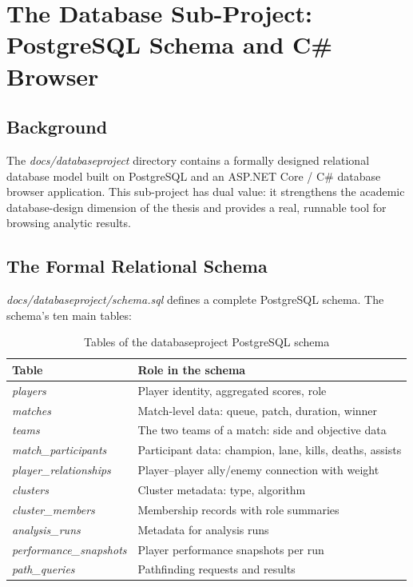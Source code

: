 \chapter{The Database Sub-Project: PostgreSQL Schema and C\# Browser}

\section{Background}

The \textit{docs/databaseproject} directory contains a formally designed relational database model built on PostgreSQL and an ASP.NET Core / C\# database browser application. This sub-project has dual value: it strengthens the academic database-design dimension of the thesis and provides a real, runnable tool for browsing analytic results.

\section{The Formal Relational Schema}

\textit{docs/databaseproject/schema.sql} defines a complete PostgreSQL schema. The schema's ten main tables:

\begin{table}[H]
\centering
\caption{Tables of the databaseproject PostgreSQL schema}
\begin{tabularx}{\textwidth}{|>{\raggedright\arraybackslash}p{4.5cm}|X|}
\hline
\textbf{Table} & \textbf{Role in the schema} \\
\hline
\textit{players} & Player identity, aggregated scores, role \\
\textit{matches} & Match-level data: queue, patch, duration, winner \\
\textit{teams} & The two teams of a match: side and objective data \\
\textit{match\_participants} & Participant data: champion, lane, kills, deaths, assists \\
\textit{player\_relationships} & Player--player ally/enemy connection with weight \\
\textit{clusters} & Cluster metadata: type, algorithm \\
\textit{cluster\_members} & Membership records with role summaries \\
\textit{analysis\_runs} & Metadata for analysis runs \\
\textit{performance\_snapshots} & Player performance snapshots per run \\
\textit{path\_queries} & Pathfinding requests and results \\
\hline
\end{tabularx}
\end{table}

